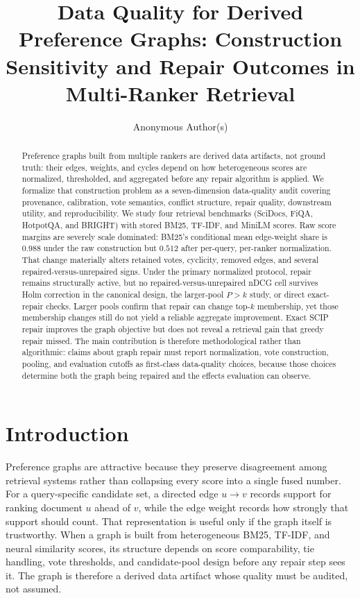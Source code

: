\documentclass[acmsmall,anonymous,review]{acmart}
\title{Data Quality for Derived Preference Graphs: Construction Sensitivity
  and Repair Outcomes in Multi-Ranker Retrieval}
\author{Anonymous Author(s)}
\affiliation{%
  \institution{Institution redacted for review}
  \country{}
}
\begin{document}
\begin{abstract}
Preference graphs built from multiple rankers are derived data artifacts,
not ground truth: their edges, weights, and cycles depend on how
heterogeneous scores are normalized, thresholded, and aggregated before any
repair algorithm is applied. We formalize that construction problem as a
seven-dimension data-quality audit covering provenance, calibration, vote
semantics, conflict structure, repair quality, downstream utility, and
reproducibility. We study four retrieval benchmarks (SciDocs, FiQA,
HotpotQA, and BRIGHT) with stored BM25, TF-IDF, and MiniLM scores. Raw
score margins are severely scale dominated: BM25's conditional mean
edge-weight share is $0.988$ under the raw construction but $0.512$ after
per-query, per-ranker normalization. That change materially alters retained
votes, cyclicity, removed edges, and several repaired-versus-unrepaired
signs. Under the primary normalized protocol, repair remains structurally
active, but no repaired-versus-unrepaired nDCG cell survives Holm
correction in the canonical design, the larger-pool $P>k$ study, or direct
exact-repair checks. Larger pools confirm that repair can change top-$k$
membership, yet those membership changes still do not yield a reliable
aggregate improvement. Exact SCIP repair improves the graph objective but
does not reveal a retrieval gain that greedy repair missed. The main
contribution is therefore methodological rather than algorithmic: claims
about graph repair must report normalization, vote construction, pooling,
and evaluation cutoffs as first-class data-quality choices, because those
choices determine both the graph being repaired and the effects evaluation
can observe.
\end{abstract}

\maketitle

\section{Introduction}
\label{sec:introduction}

Preference graphs are attractive because they preserve disagreement among
retrieval systems rather than collapsing every score into a single fused
number. For a query-specific candidate set, a directed edge
$u \rightarrow v$ records support for ranking document $u$ ahead of $v$,
while the edge weight records how strongly that support should count. That
representation is useful only if the graph itself is trustworthy. When a
graph is built from heterogeneous BM25, TF-IDF, and neural similarity
scores, its structure depends on score comparability, tie handling, vote
thresholds, and candidate-pool design before any repair step sees it. The
graph is therefore a derived data artifact whose quality must be audited,
not assumed.
\end{document}
